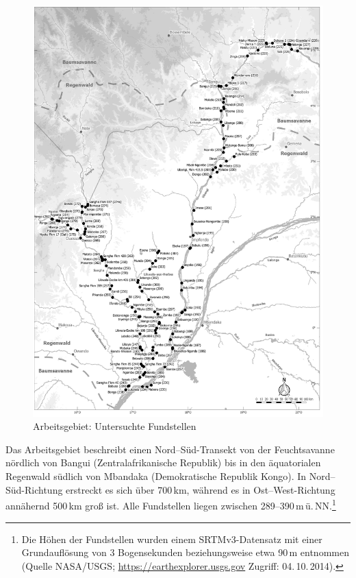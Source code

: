 \begin{multicols}{2}
\begin{figure}[p]
	\centering
	\includegraphics[width=\textwidth]{fig/FundstellenMap.jpg}
	\caption{Arbeitsgebiet: Untersuchte Fundstellen}
	\label{fig:ArbeitsgebietKarte}
\end{figure}

Das Arbeitsgebiet beschreibt einen Nord--Süd-Transekt von der Feuchtsavanne nördlich von Bangui (Zentralafrikanische Republik) bis in den äquatorialen Regenwald südlich von Mba\-ndaka (Demokratische Republik Kongo). In Nord--Süd-Richtung erstreckt es sich über 700\,km, während es in Ost--West-Richtung annähernd 500\,km groß ist. Alle Fundstellen liegen zwischen 289--390\,m\,ü.\,NN.\footnote{Die Höhen der Fundstellen wurden einem SRTMv3-Datensatz mit einer Grundauflösung von 3 Bogensekunden beziehungsweise etwa 90\,m entnommen (Quelle NASA/USGS; \url{https://earthexplorer.usgs.gov} Zugriff: 04.\,10.\,2014).}


\end{multicols}
